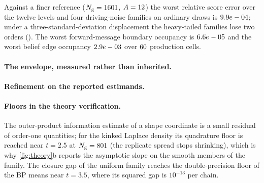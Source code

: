 Against a finer reference
($N_{\mathrm{g}}=1601$, $A=12$) the worst relative score error over the twelve levels
and four driving-noise families on ordinary draws is $9.9e-04$; under a
three-standard-deviation displacement the heavy-tailed families lose two orders
(\gcworstshift). The worst forward-message boundary occupancy is $6.6e-05$ and the
worst belief edge occupancy $2.9e-03$ over $60$ production cells.

\paragraph{The envelope, measured rather than inherited.}

\paragraph{Refinement on the reported estimands.}

\paragraph{Floors in the theory verification.}
The outer-product information estimate of a shape coordinate is a small residual of
order-one quantities; for the kinked Laplace density its quadrature floor is reached
near $t=2.5$ at $N_{\mathrm{g}}=801$ (the replicate spread stops shrinking), which is why
\cref{fig:theory}b reports the asymptotic slope on the smooth members of the family. The
closure gap of the uniform family reaches the double-precision floor of the BP means
near $t=3.5$, where its squared gap is $10^{-13}$ per chain.
